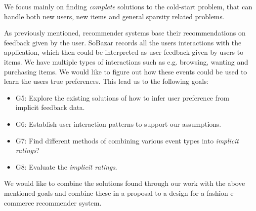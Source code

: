 We focus mainly on finding \emph{complete} solutions to the cold-start problem, that can handle both new users, new items
and general sparsity related problems.

As previously mentioned, recommender systems base their recommendations on feedback given by the user. SoBazar records
all the users interactions with the application, which then could be interpreted as user feedback given by users to items.
We have multiple types of interactions such as e.g. browsing, wanting and purchasing items. We would like to figure out
how these events could be used to learn the users true preferences. This lead us to the following goals:

\begin{itemize}
 	\item G5: Explore the existing solutions of how to infer user preference from implicit feedback data.
 	\item G6: Establish user interaction patterns to support our assumptions.
	\item G7: Find different methods of combining various event types into \emph{implicit ratings}?
  	\item G8: Evaluate the \emph{implicit ratings}.
\end{itemize}

We would like to combine the solutions found through our work with the above mentioned goals and combine these in a
proposal to a design for a fashion e-commerce recommender system.




